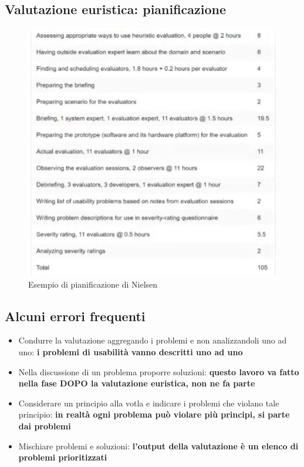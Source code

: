 \documentclass[11pt,a4paper]{book}
\begin{document}
\subsection{Valutazione euristica: pianificazione}
\begin{figure}[h!]
	\begin{center}
		\includegraphics[scale=0.6]{img/017.jpg}
		\caption{Esempio di pianificazione di Nielsen}
		\label{fig: 017}
	\end{center}
\end{figure}

\subsection{Alcuni errori frequenti}
\begin{itemize}
	\item Condurre la valutazione aggregando i problemi e non analizzandoli uno ad uno: \textbf{i problemi di usabilità vanno descritti uno ad uno}
	\item Nella discussione di un problema proporre soluzioni: \textbf{questo lavoro va fatto nella fase DOPO la valutazione euristica, non ne fa parte}
	\item Considerare un principio alla votla e indicare i problemi che violano tale principio: \textbf{in realtà ogni problema può violare più principi, si parte dai problemi}
	\item Mischiare problemi e soluzioni: \textbf{l'output della valutazione è un elenco di problemi prioritizzati}
\end{itemize}
\end{document}
